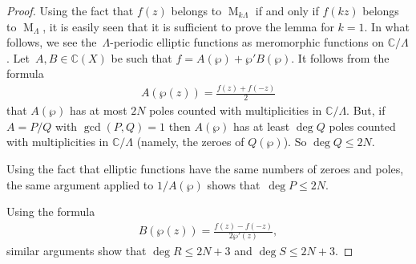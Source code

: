 \documentclass[10pt,a4paper]{amsart}
\numberwithin{equation}{section}
\begin{document}
\begin{proof}
Using the fact that $f(z)$ belongs to $\operatorname{M}_{k\Lambda}$ if and only if $f(kz)$ belongs to
$\operatorname{M}_{\Lambda}$, it is easily seen that it is suf\/f\/icient to prove the lemma for $k=1$.
In what follows, we see the~$\Lambda$-periodic elliptic functions as meromorphic functions on $\mathbb C/\Lambda$.
Let~$A,B \in \mathbb C(X)$ be such that $f=A(\wp)+\wp' B(\wp)$.
It follows from the formula
\begin{gather*}
A(\wp(z))=\frac{f(z)+f(-z)}{2}
\end{gather*}
that $A(\wp)$ has at most $2N$ poles counted with multiplicities in $\mathbb C/\Lambda$.
But, if $A=P/Q$ with $\gcd(P,Q)=1$ then $A(\wp)$ has at least $\deg Q$ poles counted with multiplicities in $\mathbb
C/\Lambda$ (namely, the zeroes of $Q(\wp)$).
So $\deg Q \leq 2N$.

Using the fact that elliptic functions have the same numbers of zeroes and poles, the same argument applied to
$1/A(\wp)$ shows that~${\deg P \leq 2N}$.

Using the formula
\begin{gather*}
B(\wp(z))=\frac{f(z)-f(-z)}{2 \wp'(z)},
\end{gather*}
similar arguments show that $\deg R \leq 2N+3$ and $\deg S \leq 2N+3$.
\end{proof}
\end{document}
